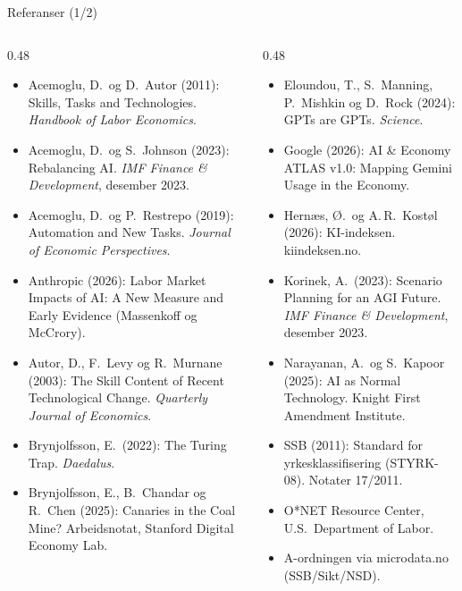 \begin{frame}{Referanser (1/2)}
\scriptsize
\begin{columns}[T,onlytextwidth]
\begin{column}{0.48\textwidth}
\begin{itemize}\setlength{\itemsep}{2pt}
  \item Acemoglu, D.\ og D.\ Autor (2011): Skills, Tasks and Technologies. \emph{Handbook of Labor Economics}.
  \item Acemoglu, D.\ og S.\ Johnson (2023): Rebalancing AI. \emph{IMF Finance \& Development}, desember 2023.
  \item Acemoglu, D.\ og P.\ Restrepo (2019): Automation and New Tasks. \emph{Journal of Economic Perspectives}.
  \item Anthropic (2026): Labor Market Impacts of AI: A New Measure and Early Evidence (Massenkoff og McCrory).
  \item Autor, D., F.\ Levy og R.\ Murnane (2003): The Skill Content of Recent Technological Change. \emph{Quarterly Journal of Economics}.
  \item Brynjolfsson, E.\ (2022): The Turing Trap. \emph{Daedalus}.
  \item Brynjolfsson, E., B.\ Chandar og R.\ Chen (2025): Canaries in the Coal Mine? Arbeidsnotat, Stanford Digital Economy Lab.
\end{itemize}
\end{column}
\begin{column}{0.48\textwidth}
\begin{itemize}\setlength{\itemsep}{2pt}
  \item Eloundou, T., S.\ Manning, P.\ Mishkin og D.\ Rock (2024): GPTs are GPTs. \emph{Science}.
  \item Google (2026): AI \& Economy ATLAS v1.0: Mapping Gemini Usage in the Economy.
  \item Hernæs, Ø.\ og A.\,R.\ Kostøl (2026): KI-indeksen. kiindeksen.no.
  \item Korinek, A.\ (2023): Scenario Planning for an AGI Future. \emph{IMF Finance \& Development}, desember 2023.
  \item Narayanan, A.\ og S.\ Kapoor (2025): AI as Normal Technology. Knight First Amendment Institute.
  \item SSB (2011): Standard for yrkesklassifisering (STYRK-08). Notater 17/2011.
  \item O*NET Resource Center, U.S.\ Department of Labor.
  \item A-ordningen via microdata.no (SSB/Sikt/NSD).
\end{itemize}
\end{column}
\end{columns}
\end{frame}

